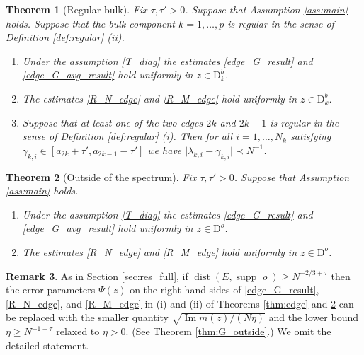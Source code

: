 \documentclass[11pt]{article} %
\numberwithin{equation}{section}
\numberwithin{figure}{section}
\theoremstyle{plain} %
\newtheorem{theorem}{Theorem}[section]
\theoremstyle{definition} %
\newtheorem{remark}[theorem]{Remark}
\newcommand{\f}[1]{\boldsymbol{\mathrm{#1}}} %
\renewcommand{\geq}{\geqslant}
\newcommand{\abs}[1]{\lvert #1 \rvert}
\DeclareMathOperator{\supp}{supp}
\DeclareMathOperator{\im}{Im}
\DeclareMathOperator{\dist}{dist}
\begin{document}
\begin{theorem}[Regular bulk] \label{thm:bulk}
Fix $\tau,\tau'>0$. Suppose that Assumption \ref{ass:main} holds. Suppose that the bulk component $k = 1, \dots, p$ is regular in the sense of Definition \ref{def:regular} (ii).
\begin{enumerate}
\item
Under the assumption \eqref{T_diag} the estimates \eqref{edge_G_result} and \eqref{edge_G_avg_result} hold uniformly in $z \in \f D^b_k$.
\item
The estimates \eqref{R_N_edge} and \eqref{R_M_edge} hold uniformly in $z \in \f D^b_k$.
\item
Suppose that at least one of the two edges $2k$ and $2k-1$ is regular in the sense of Definition \ref{def:regular} (i). Then for all $i = 1, \dots, N_{k}$ satisfying $\gamma_{k,i} \in [a_{2k} + \tau', a_{2k - 1} - \tau']$ we have $\abs{\lambda_{k,i} - \gamma_{k,i}} \prec N^{-1}$.
\end{enumerate}
\end{theorem}

\begin{theorem}[Outside of the spectrum] \label{thm:outside}
Fix $\tau,\tau'>0$. Suppose that Assumption \ref{ass:main} holds.
\begin{enumerate}
\item
Under the assumption \eqref{T_diag} the estimates \eqref{edge_G_result} and \eqref{edge_G_avg_result} hold uniformly in $z \in \f D^o$.
\item
The estimates \eqref{R_N_edge} and \eqref{R_M_edge} hold uniformly in $z \in \f D^o$.
\end{enumerate}
\end{theorem}

\begin{remark}
As in Section \ref{sec:res_full}, if $\dist(E, \supp \varrho) \geq N^{-2/3 + \tau}$ then the error parameters $\Psi(z)$ on the right-hand sides of \eqref{edge_G_result}, \eqref{R_N_edge}, and \eqref{R_M_edge} in (i) and (ii) of Theorems \ref{thm:edge} and \ref{thm:outside} can be replaced with the smaller quantity $\sqrt{\im m(z) /(N \eta)}$ and the lower bound $\eta \geq N^{-1 + \tau}$ relaxed to $\eta > 0$. (See Theorem \ref{thm:G_outside}.) We omit the detailed statement.
\end{remark}
\end{document}
